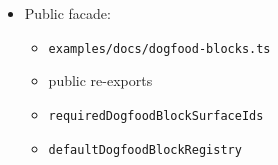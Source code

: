 \begin{itemize}
\begin{itemize}
  \item
    \texttt{e\allowbreak{}x\allowbreak{}a\allowbreak{}m\allowbreak{}p\allowbreak{}l\allowbreak{}e\allowbreak{}s\allowbreak{}/\allowbreak{}d\allowbreak{}o\allowbreak{}c\allowbreak{}s\allowbreak{}/\allowbreak{}d\allowbreak{}o\allowbreak{}g\allowbreak{}f\allowbreak{}o\allowbreak{}o\allowbreak{}d\allowbreak{}-\allowbreak{}b\allowbreak{}l\allowbreak{}o\allowbreak{}c\allowbreak{}k\allowbreak{}-\allowbreak{}w\allowbreak{}o\allowbreak{}r\allowbreak{}k\allowbreak{}b\allowbreak{}e\allowbreak{}n\allowbreak{}c\allowbreak{}h\allowbreak{}.\allowbreak{}t\allowbreak{}s}
  \item
    \texttt{e\allowbreak{}x\allowbreak{}a\allowbreak{}m\allowbreak{}p\allowbreak{}l\allowbreak{}e\allowbreak{}s\allowbreak{}/\allowbreak{}d\allowbreak{}o\allowbreak{}c\allowbreak{}s\allowbreak{}/\allowbreak{}d\allowbreak{}o\allowbreak{}g\allowbreak{}f\allowbreak{}o\allowbreak{}o\allowbreak{}d\allowbreak{}-\allowbreak{}b\allowbreak{}l\allowbreak{}o\allowbreak{}c\allowbreak{}k\allowbreak{}-\allowbreak{}w\allowbreak{}o\allowbreak{}r\allowbreak{}k\allowbreak{}b\allowbreak{}e\allowbreak{}n\allowbreak{}c\allowbreak{}h\allowbreak{}-\allowbreak{}r\allowbreak{}e\allowbreak{}n\allowbreak{}d\allowbreak{}e\allowbreak{}r\allowbreak{}.\allowbreak{}t\allowbreak{}s}
  \end{itemize}
\item
  Public facade:

  \begin{itemize}
  \tightlist
  \item
    \texttt{e\allowbreak{}x\allowbreak{}a\allowbreak{}m\allowbreak{}p\allowbreak{}l\allowbreak{}e\allowbreak{}s\allowbreak{}/\allowbreak{}d\allowbreak{}o\allowbreak{}c\allowbreak{}s\allowbreak{}/\allowbreak{}d\allowbreak{}o\allowbreak{}g\allowbreak{}f\allowbreak{}o\allowbreak{}o\allowbreak{}d\allowbreak{}-\allowbreak{}b\allowbreak{}l\allowbreak{}o\allowbreak{}c\allowbreak{}k\allowbreak{}s\allowbreak{}.\allowbreak{}t\allowbreak{}s}
  \item
    public re-exports
  \item
    \texttt{r\allowbreak{}e\allowbreak{}q\allowbreak{}u\allowbreak{}i\allowbreak{}r\allowbreak{}e\allowbreak{}d\allowbreak{}D\allowbreak{}o\allowbreak{}g\allowbreak{}f\allowbreak{}o\allowbreak{}o\allowbreak{}d\allowbreak{}B\allowbreak{}l\allowbreak{}o\allowbreak{}c\allowbreak{}k\allowbreak{}S\allowbreak{}u\allowbreak{}r\allowbreak{}f\allowbreak{}a\allowbreak{}c\allowbreak{}e\allowbreak{}I\allowbreak{}d\allowbreak{}s}
  \item
    \texttt{d\allowbreak{}e\allowbreak{}f\allowbreak{}a\allowbreak{}u\allowbreak{}l\allowbreak{}t\allowbreak{}D\allowbreak{}o\allowbreak{}g\allowbreak{}f\allowbreak{}o\allowbreak{}o\allowbreak{}d\allowbreak{}B\allowbreak{}l\allowbreak{}o\allowbreak{}c\allowbreak{}k\allowbreak{}R\allowbreak{}e\allowbreak{}g\allowbreak{}i\allowbreak{}s\allowbreak{}t\allowbreak{}r\allowbreak{}y}
  \end{itemize}
\end{itemize}

